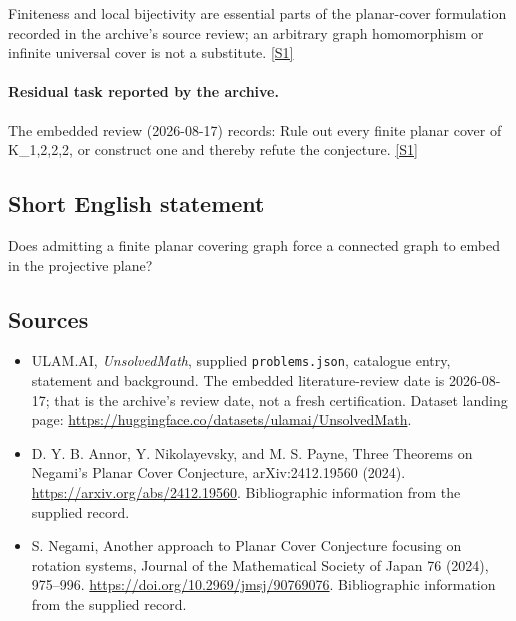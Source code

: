 \documentclass[11pt,a4paper]{article}
\newcommand{\sref}[2]{\hyperlink{source:#1:#2}{[S#2]}}
\begin{document}
Finiteness and local bijectivity are essential parts of the planar-cover formulation recorded in the archive’s source review; an arbitrary graph homomorphism or infinite universal cover is not a substitute. \sref{statement}{1}

\paragraph{Residual task reported by the archive.}

The embedded review (2026-08-17) records: Rule out every finite planar cover of K\_{1,2,2,2}, or construct one and thereby refute the conjecture. \sref{statement}{1}

\subsection{Short English statement}

Does admitting a finite planar covering graph force a connected graph to embed in the projective plane?

\subsection{Sources}

{\small

\begin{itemize}

\item[\hypertarget{source:statement:1}{S1}] ULAM.AI, \emph{UnsolvedMath}, supplied \texttt{problems.json}, catalogue entry, statement and background. The embedded literature-review date is 2026-08-17; that is the archive’s review date, not a fresh certification. Dataset landing page: \url{https://huggingface.co/datasets/ulamai/UnsolvedMath}.

\item[\hypertarget{source:statement:2}{S2}] D. Y. B. Annor, Y. Nikolayevsky, and M. S. Payne, Three Theorems on Negami's Planar Cover Conjecture, arXiv:2412.19560 (2024). \url{https://arxiv.org/abs/2412.19560}. Bibliographic information from the supplied record.

\item[\hypertarget{source:statement:3}{S3}] S. Negami, Another approach to Planar Cover Conjecture focusing on rotation systems, Journal of the Mathematical Society of Japan 76 (2024), 975–996. \url{https://doi.org/10.2969/jmsj/90769076}. Bibliographic information from the supplied record.

\end{itemize}

}

\label{end:statement}
\end{document}

